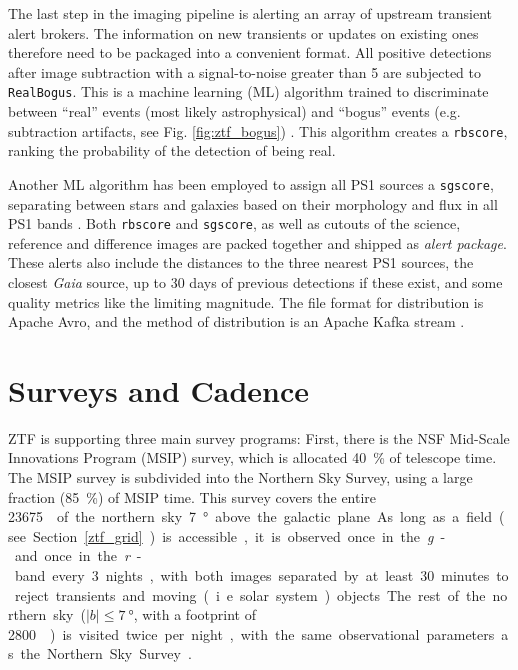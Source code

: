 The last step in the imaging pipeline is alerting an array of upstream transient alert brokers. The information on new transients or updates on existing ones therefore need to be packaged into a convenient format. All positive detections after image subtraction with a signal-to-noise greater than 5 are subjected to \texttt{RealBogus}. This is a machine learning (ML) algorithm trained to discriminate between ``real'' events (most likely astrophysical) and ``bogus'' events (e.g. subtraction artifacts, see Fig. \ref{fig:ztf_bogus}) . This algorithm creates a \texttt{rbscore}, ranking the probability of the detection of being real.

Another ML algorithm has been employed to assign all PS1 sources a \texttt{sgscore}, separating between stars and galaxies based on their morphology and flux in all PS1 bands . Both \texttt{rbscore} and \texttt{sgscore}, as well as cutouts of the science, reference and difference images are packed together and shipped as \textit{alert package}. These alerts also include the distances to the three nearest PS1 sources, the closest \textit{Gaia} source, up to 30 days of previous detections if these exist, and some quality metrics like the limiting magnitude. The file format for distribution is Apache Avro, and the method of distribution is an Apache Kafka stream .

\section{Surveys and Cadence}
ZTF is supporting three main survey programs: First, there is the NSF Mid-Scale Innovations Program (MSIP) survey, which is allocated \SI{40}{\percent} of telescope time. The MSIP survey is subdivided into the Northern Sky Survey, using a large fraction (\SI{85}{\percent}) of MSIP time. This survey covers the entire \SI{23675}{\square\deg} of the northern sky \SI{7}{\degree} above the galactic plane. As long as a field (see Section \ref{ztf_grid}) is accessible, it is observed once in the \textit{g}- and once in the \textit{r}-band every 3 nights, with both images separated by at least 30 minutes to reject transients and moving (i.e. solar system) objects. The rest of the northern sky ($|b|\leq \SI{7}{\degree}$, with a footprint of \SI{2800}{\square\deg}) is visited twice per night, with the same observational parameters as the Northern Sky Survey \cite{Bellm2019a}.

